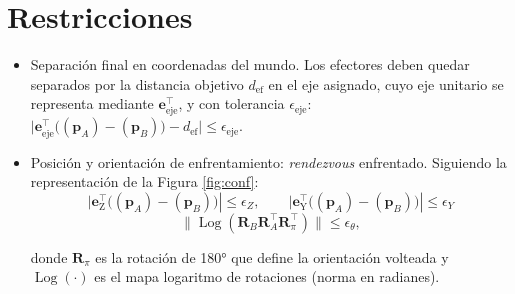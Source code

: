 \section*{Restricciones}
\begin{itemize}
  \item Separación final en coordenadas del mundo. Los efectores deben quedar separados 
  por la distancia objetivo \(d_{\text{ef}}\) en el eje asignado, cuyo eje unitario se representa mediante 
  $\mathbf{e}_{\text{eje}}^\top$, y con tolerancia \(\epsilon_{\text{eje}}\):
  $
  \big|\mathbf{e}_{\text{eje}}^\top\big((\mathbf{p}_A)-(\mathbf{p}_B)\big)-d_{\text{ef}}\big|\le\epsilon_{\text{eje}}
  $.

  \item Posición y orientación de enfrentamiento: \textit{rendezvous} enfrentado. 
  Siguiendo la representación de la Figura \ref{fig:conf}:\\
  \[\big|\mathbf{e}_{\text{Z}}^\top\big((\mathbf{p}_A)-(\mathbf{p}_B)\big)|\le\epsilon_Z, 
  \qquad\big|\mathbf{e}_{\text{Y}}^\top\big((\mathbf{p}_A)-(\mathbf{p}_B)\big)|\le\epsilon_Y\]
  \[
  \|\operatorname{Log}(\mathbf{R}_B \mathbf{R}_A^\top \mathbf{R}_{\pi}^\top)\|\le \epsilon_{\theta},
  \]



  donde \(\mathbf{R}_{\pi}\) es la rotación de 180° que define la orientación volteada y \(\operatorname{Log}(\cdot)\)
  es el mapa logaritmo de rotaciones (norma en radianes). \\


\end{itemize}
